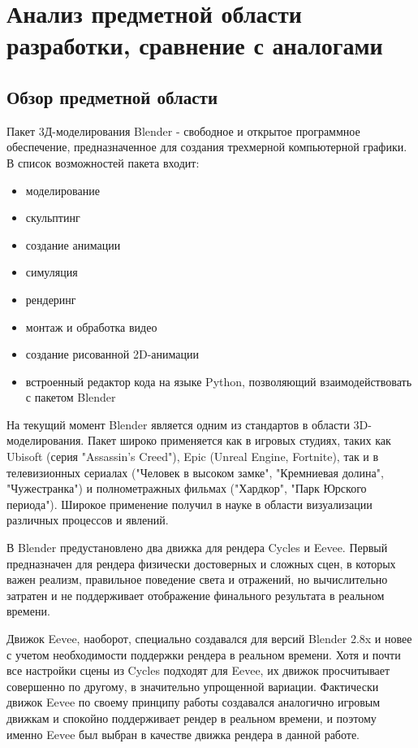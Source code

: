 \section{Анализ предметной области разработки, сравнение с аналогами}

\subsection{Обзор предметной области}
Пакет 3Д-моделирования Blender - свободное и открытое программное обеспечение, предназначенное для создания трехмерной компьютерной графики. В список возможностей пакета входит:
\begin{itemize}
	\item моделирование
	\item скульптинг
	\item создание анимации
	\item симуляция
	\item рендеринг
	\item монтаж и обработка видео
	\item создание рисованной 2D-анимации
	\item встроенный редактор кода на языке Python, позволяющий взаимодействовать с пакетом Blender
\end{itemize}

На текущий момент Blender является одним из стандартов в области 3D-моделирования. Пакет широко применяется как в игровых студиях, таких как Ubisoft (серия "Assassin's Creed"), Epic (Unreal Engine, Fortnite), так и в телевизионных сериалах ("Человек в высоком замке", "Кремниевая долина", "Чужестранка") и полнометражных фильмах ("Хардкор", "Парк Юрского периода"). Широкое применение получил в науке в области визуализации различных процессов и явлений.

В Blender предустановлено два движка для рендера Cycles и Eevee. Первый предназначен для рендера физически достоверных и сложных сцен, в которых важен реализм, правильное поведение света и отражений, но вычислительно затратен и не поддерживает отображение финального результата в реальном времени.

Движок Eevee, наоборот, специально создавался для версий Blender 2.8x и новее с учетом необходимости поддержки рендера в реальном времени. Хотя и почти все настройки сцены из Cycles подходят для Eevee, их движок просчитывает совершенно по другому, в значительно упрощенной вариации. Фактически движок Eevee по своему принципу работы создавался аналогично игровым движкам и спокойно поддерживает рендер в реальном времени, и поэтому именно Eevee был выбран в качестве движка рендера в данной работе.

